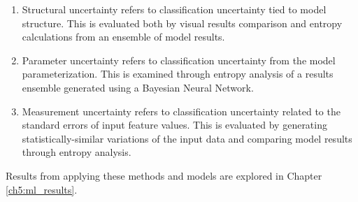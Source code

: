 \begin{enumerate}
    \item Structural uncertainty refers to classification uncertainty tied to model structure. This is evaluated both by visual results comparison and entropy calculations from an ensemble of model results.
    \item Parameter uncertainty refers to classification uncertainty from the model parameterization. This is examined through entropy analysis of a results ensemble generated using a Bayesian Neural Network.
    \item Measurement uncertainty refers to classification uncertainty related to the standard errors of input feature values. This is evaluated by generating statistically-similar variations of the input data and comparing model results through entropy analysis. 
\end{enumerate}

Results from applying these methods and models are explored in Chapter \ref{ch5:ml_results}. 